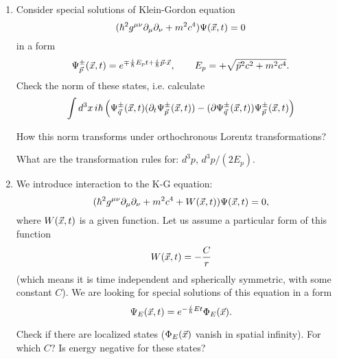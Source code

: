 \documentclass[a4paper,11pt]{article}
\begin{document}
\begin{enumerate}
\item Consider special solutions of Klein-Gordon equation
  \begin{equation}
    \label{eq:4}
    ( \hbar^{ 2 } g^{ \mu \nu } \partial_{ \mu } \partial_{ \nu } + m^{ 2 } c^{ 4 } ) \Psi( \vec{ x }, t )
    = 0
  \end{equation}
  in a form
  \begin{equation}
    \label{eq:5}
    \Psi^{ \pm }_{ \vec{ p } }( \vec{ x }, t ) =
    e^{ \mp \frac{ i }{ \hbar } E_{ p } t + \frac{ i }{ \hbar } \vec{ p } \cdot \vec{ x } }, \qquad
    E_{ p } = +\sqrt{ \vec{ p }^{ 2 } c^{ 2 } + m^{ 2 } c^{ 4 } }.
  \end{equation}
  Check the norm of these states, i.e. calculate
  \begin{equation}
    \label{eq:11}
    \int d^{ 3 } x \, i \hbar
    \left( \Psi^{ \pm }_{ \vec{ q } }( \vec{ x }, t )
      ( \partial_{ t } \Psi^{ \pm }_{ \vec{ p } }( \vec{ x }, t ) )
      - ( \partial \Psi^{ \pm }_{ \vec{ q } }( \vec{ x }, t ) ) \Psi^{ \pm }_{ \vec{ p } }( \vec{ x }, t )
    \right)
  \end{equation}

  How this norm transforms under orthochronous Lorentz
  transformations?

  What are the transformation rules for: $d^{ 3 } p$,
  $d^{ 3 } p / ( 2 E_{ p } )$.

\item We introduce interaction to the K-G equation:
  \begin{equation}
    \label{eq:12}
    ( \hbar^{ 2 } g^{ \mu \nu } \partial_{ \mu } \partial_{ \nu } + m^{ 2 } c^{ 4 } + W( \vec{ x }, t ) )
    \Psi( \vec{ x }, t )
    = 0,
  \end{equation}
  where $W( \vec{ x }, t )$ is a given function. Let us assume a
  particular form of this function
  \begin{equation}
    \label{eq:13}
    W( \vec{ x }, t ) = -\frac{ C }{ r }
  \end{equation}
  (which means it is time independent and spherically symmetric, with
  some constant $C$). We are looking for special solutions of this
  equation in a form
  \begin{equation}
    \label{eq:14}
    \Psi_{ E }( \vec{ x }, t ) = e^{ -\frac{ i }{ \hbar } E t } \Phi_{ E }( \vec{ x } ).
  \end{equation}

  Check if there are localized states ($\Phi_{ E }( \vec{ x } )$ vanish in
  spatial infinity). For which $C$? Is energy negative for these
  states?


\end{enumerate}
\end{document}

